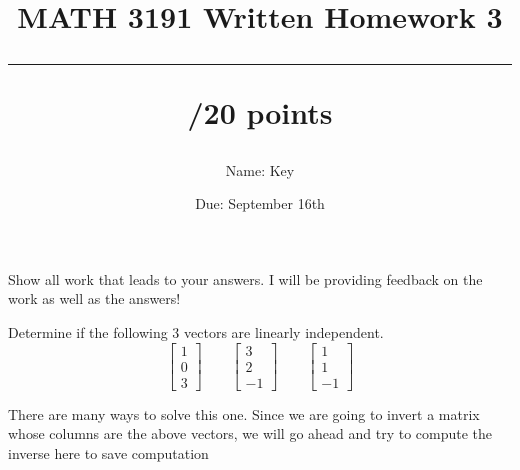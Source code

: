 \documentclass[answers]{exam}
\title{MATH 3191 Written Homework 3\\\rule{30pt}{1pt}/20 points}
\author{Name: Key}
\date{Due: September 16th}
\begin{document}
\maketitle
Show all work that leads to your answers. I will be providing feedback on the work as well as the answers!
\begin{questions}
    \question[10] Determine if the following $3$ vectors are linearly independent.
    \[
        \begin{bmatrix}
            1\\0\\3
        \end{bmatrix} \qquad
        \begin{bmatrix}
            3\\2\\-1
        \end{bmatrix}\qquad
        \begin{bmatrix}
            1\\1\\-1
        \end{bmatrix}
    \]
    \begin{solution}
        There are many ways to solve this one. Since we are going to invert a matrix whose columns
        are the above vectors, we will go ahead and try to compute the inverse here to save computation


\end{solution}
\end{questions}
\end{document}
